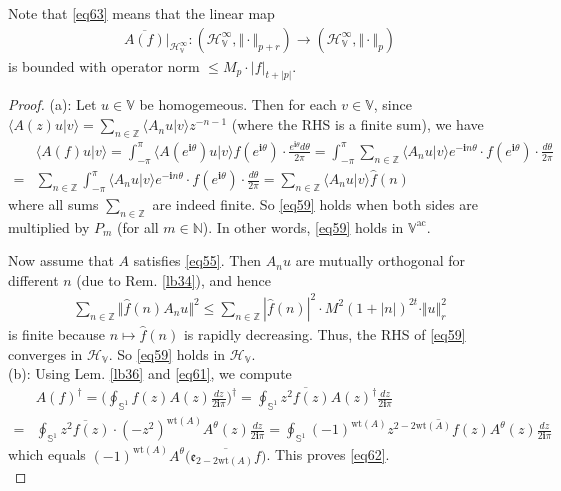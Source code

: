 \documentclass[12pt,b5paper,notitlepage]{article}
\theoremstyle{definition}
\theoremstyle{plain}
\newcommand{\wht}{\widehat}
\newcommand{\ovl}{\overline}
\newcommand{\bk}[1]{\langle {#1}\rangle}
\newcommand{\im}{\mathbf{i}}
\newcommand{\Vbb}{\mathbb V}
\newcommand{\Nbb}{\mathbb N}
\newcommand{\Zbb}{\mathbb Z}
\newcommand{\wt}{\mathrm{wt}}
\newcommand{\Sbb}{{\mathbb S}}
\newcommand{\HV}{\mathcal H_{\mathbb V}}
\newcommand{\ek}{\mathfrak{e}}
\newcommand{\ointn}{\oint\nolimits}
\newcommand{\ac}{\mathrm{ac}}
\numberwithin{equation}{section}
\begin{document}
Note that \eqref{eq63} means that the linear map
\begin{align}
\ovl{A(f)}\big|_{\HV^\infty}:(\HV^\infty,\Vert\cdot\Vert_{p+r})\rightarrow (\HV^\infty,\Vert\cdot\Vert_p)
\end{align}
is bounded with operator norm $\leq M_p\cdot |f|_{t+|p|}$.


\begin{proof}
(a): Let $u\in\Vbb$ be homogemeous. Then for each $v\in\Vbb$, since $\bk{A(z)u|v}=\sum_{n\in\Zbb}\bk{A_nu|v}z^{-n-1}$ (where the RHS is a finite sum), we have
\begin{align*}
&\bk{A(f)u|v}=\int_{-\pi}^\pi \bk{A(e^{\im \theta})u|v}f(e^{\im \theta})\cdot \frac{e^{\im\theta}d\theta}{2\pi}=\int_{-\pi}^\pi \sum_{n\in\Zbb}\bk{A_nu|v}e^{-\im n\theta}\cdot f(e^{\im \theta})\cdot \frac{d\theta}{2\pi}\\
=& \sum_{n\in\Zbb}\int_{-\pi}^\pi\bk{A_nu|v}e^{-\im n\theta}\cdot f(e^{\im \theta})\cdot \frac{d\theta}{2\pi}=\sum_{n\in\Zbb} \bk{A_nu|v}\wht f(n)
\end{align*}
where all sums $\sum_{n\in\Zbb}$ are indeed finite. So \eqref{eq59} holds when both sides are multiplied by $P_m$ (for all $m\in\Nbb$). In other words, \eqref{eq59} holds in $\Vbb^\ac$. 

Now assume that $A$ satisfies \eqref{eq55}. Then $A_nu$ are mutually orthogonal for different $n$ (due to Rem. \ref{lb34}), and hence
\begin{align*}
\sum_{n\in\Zbb} \Vert \wht f(n)A_nu\Vert^2\leq \sum_{n\in\Zbb} |\wht f(n)|^2 \cdot M^2(1+|n|)^{2t}\cdot\Vert u\Vert_r^2
\end{align*}
is finite because $n\mapsto\wht f(n)$ is rapidly decreasing. Thus, the RHS of \eqref{eq59} converges in $\HV$. So \eqref{eq59} holds in $\HV$.\\[-1ex]

(b): Using Lem. \ref{lb36} and \eqref{eq61}, we compute
\begin{align*}
&A(f)^\dagger=\Big(\ointn_{\Sbb^1}f(z)A(z)\frac{dz}{2\im\pi}\Big)^\dagger=\ointn_{\Sbb^1} \ovl{z^2f(z)}A(z)^\dagger\frac{dz}{2\im\pi}\\
=&\ointn_{\Sbb^1} \ovl{z^2f(z)}\cdot (-z^2)^{\wt(A)}A^\theta(z)\frac{dz}{2\im\pi}=\ointn_{\Sbb^1}(-1)^{\wt(A)}\ovl{z^{2-2\wt(A)}f(z)}A^\theta(z)\frac{dz}{2\im\pi}
\end{align*}
which equals $(-1)^{\wt(A)}A^\theta\big(\ovl{\ek_{2-2\wt(A)}f}\big)$. This proves \eqref{eq62}.\\[-1ex]


\end{proof}
\end{document}
